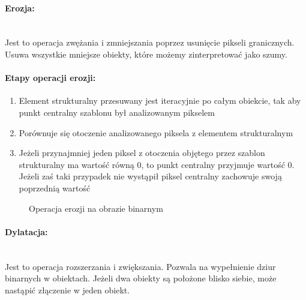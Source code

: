 \documentclass[a4paper,12pt,twoside,openany]{report}
\newcommand{\ImgPath}{.}
\begin{document}
\paragraph{Erozja:}\mbox{} \\
Jest to operacja zwężania i zmniejszania poprzez usunięcie pikseli granicznych. Usuwa wszystkie mniejsze obiekty, które możemy zinterpretować jako szumy. 

\paragraph{Etapy operacji erozji:}
\begin{enumerate}
	\item Element strukturalny przesuwany jest iteracyjnie po całym obiekcie,  tak aby punkt centralny szablonu był analizowanym pikselem
	\item Porównuje się otoczenie analizowanego piksela z elementem strukturalnym
	\item  Jeżeli przynajmniej jeden piksel z otoczenia objętego przez szablon strukturalny ma wartość równą 0, to punkt centralny przyjmuje wartość 0. Jeżeli zaś taki przypadek nie wystąpił piksel centralny zachowuje swoją poprzednią wartość
\end{enumerate}

\begin{figure}[H]
	\centering
	\caption{Operacja erozji na obrazie binarnym}
\end{figure}

\paragraph{Dylatacja:}\mbox{} \\
Jest to operacja rozszerzania i zwiększania. Pozwala na wypełnienie dziur binarnych w obiektach. Jeżeli dwa obiekty są położone blisko siebie, może nastąpić złączenie w jeden obiekt.
\end{document}
